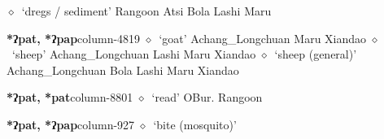         $\diamond$~`dregs / sediment'
         Rangoon 
\hspace{1ex}
         Atsi 
\hspace{1ex}
         Bola 
\hspace{1ex}
         Lashi 
\hspace{1ex}
         Maru 
  \item {\footnotesize \textbf{*ʔpat, *ʔpap}}{\tiny column-4819}
         $\diamond$~`goat'
         Achang\_Longchuan 
\hspace{1ex}
         Maru 
\hspace{1ex}
         Xiandao 
\hspace{1ex}
         $\diamond$~`sheep'
         Achang\_Longchuan 
\hspace{1ex}
         Lashi 
\hspace{1ex}
         Maru 
\hspace{1ex}
         Xiandao 
\hspace{1ex}
         $\diamond$~`sheep (general)'
         Achang\_Longchuan 
\hspace{1ex}
         Bola 
\hspace{1ex}
         Lashi 
\hspace{1ex}
         Maru 
\hspace{1ex}
         Xiandao 
  \item {\footnotesize \textbf{*ʔpat, *pat}}{\tiny column-8801}
         $\diamond$~`read'
         OBur. 
\hspace{1ex}
         Rangoon 
  \item {\footnotesize \textbf{*ʔpat, *ʔpap}}{\tiny column-927}
         $\diamond$~`bite (mosquito)'
